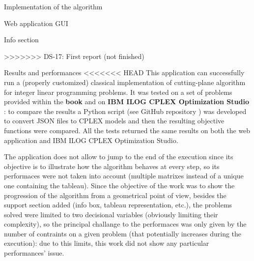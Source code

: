 \documentclass[9pt]{extarticle}
\begin{document}
\begin{section}{Implementation of the algorithm}
\begin{subsection}{Web application GUI}
\begin{subsubsection}{Info section}

>>>>>>> DS-17: First report (not finished)
            \end{subsubsection}
        \end{subsection}
    \end{section}

    \begin{section}{Results and performances}
<<<<<<< HEAD
        This application can successfully run a (properly customized) classical implementation of cutting-plane algorithm for integer linear 
        programming problems. 
        It was tested on a set of problems provided within the \textbf{book}\cite{book} and on \textbf{IBM ILOG CPLEX Optimization Studio}
        \cite{web:cplex}: to compare the results a Python script (see GitHub repository \cite{github:project}) was developed to convert JSON files 
        to CPLEX models and then the resulting objective functions were compared. 
        All the tests returned the same results on both the web application and IBM ILOG CPLEX Optimization Studio.

        The application does not allow to jump to the end of the execution since its objective is to illustrate how the algorithm behaves at every 
        step, so its performaces were not taken into account (multiple matrixes instead of a unique one containing the tableau). 
        Since the objective of the work was to show the progression of the algorithm from a geometrical point of view, besides the support section
        added (info box, tableau representation, etc.), the problems solved were limited to two decisional variables (obviously limiting their 
        complexity), so the principal challange to the performaces was only given by the number of contraints on a given problem (that potentially 
        increases during the execution): due to this limits, this work did not show any particular performances' issue.
    \end{section}
\end{document}
